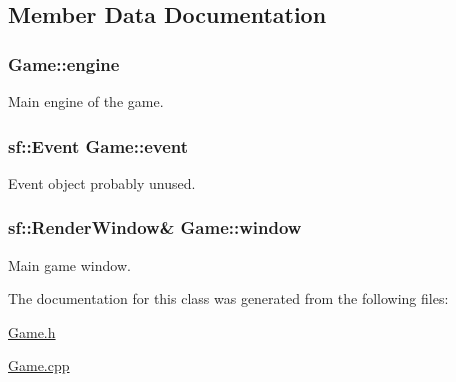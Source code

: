 \subsection{Member Data Documentation}
\hypertarget{class_game_ad407022fcdd5ece2ccb8ae9ab6558a73}{}
\subsubsection[{engine}]{ Game\+::engine\hspace{0.3cm}{\ttfamily [private]}}\label{class_game_ad407022fcdd5ece2ccb8ae9ab6558a73}


Main engine of the game. 

\hypertarget{class_game_a399e6ac5b37307b16dc9f769e0b538c9}{}
\subsubsection[{event}]{\setlength{\rightskip}{0pt plus 5cm}sf\+::\+Event Game\+::event\hspace{0.3cm}{\ttfamily [private]}}\label{class_game_a399e6ac5b37307b16dc9f769e0b538c9}


Event object probably unused. 

\hypertarget{class_game_ad0fb4d8653dcf289fd6573cf5ba0f3d1}{}
\subsubsection[{window}]{\setlength{\rightskip}{0pt plus 5cm}sf\+::\+Render\+Window\& Game\+::window\hspace{0.3cm}{\ttfamily [private]}}\label{class_game_ad0fb4d8653dcf289fd6573cf5ba0f3d1}


Main game window. 



The documentation for this class was generated from the following files\+:\begin{DoxyCompactItemize}
\item 
\hyperlink{_game_8h}{Game.\+h}\item 
\hyperlink{_game_8cpp}{Game.\+cpp}\end{DoxyCompactItemize}
